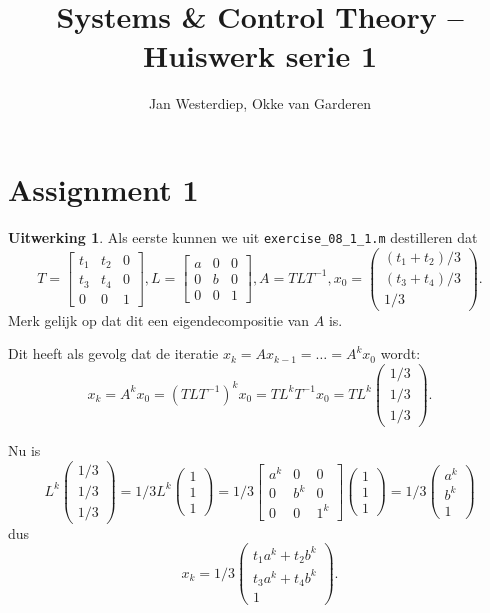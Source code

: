 \documentclass[11pt]{amsart}
\theoremstyle{definition}
\newtheorem*{uitwerking}{Uitwerking}
\begin{document}
\title{Systems \& Control Theory -- Huiswerk serie 1}
\author{Jan Westerdiep, Okke van Garderen}
\maketitle

\section*{Assignment 1}
\begin{uitwerking}
  Als eerste kunnen we uit \texttt{exercise\_08\_1\_1.m} destilleren dat
  \[
  T = \begin{bmatrix} t_1 & t_2 & 0 \\ t_3 & t_4 & 0 \\ 0 & 0 & 1 \end{bmatrix},
  L = \begin{bmatrix} a & 0 & 0 \\ 0 & b & 0 \\ 0 & 0 & 1 \end{bmatrix},
  A = T L T^{-1}, x_0 = \begin{pmatrix} (t_1 + t_2)/3 \\ (t_3 + t_4)/3 \\ 1/3 \end{pmatrix}.
  \]
  Merk gelijk op dat dit een eigendecompositie van $A$ is.

  Dit heeft als gevolg dat de iteratie $x_k = A x_{k-1} = \ldots = A^k x_0$ wordt:
  \[
  x_k = A^k x_0 = (T L T^{-1})^k x_0 = TL^k T^{-1} x_0 = T L^k \begin{pmatrix} 1/3 \\ 1/3 \\ 1/3 \end{pmatrix}.
  \]

  Nu is
  \[
  L^k \begin{pmatrix} 1/3 \\ 1/3 \\ 1/3 \end{pmatrix} = 1/3 L^k \begin{pmatrix} 1 \\ 1 \\ 1 \end{pmatrix} = 1/3 \begin{bmatrix} a^k & 0 & 0 \\ 0 & b^k & 0 \\ 0 & 0 & 1^k \end{bmatrix}\begin{pmatrix} 1 \\ 1 \\ 1 \end{pmatrix} = 1/3 \begin{pmatrix} a^k \\ b^k \\ 1 \end{pmatrix}
  \]
  dus
  \[
  x_k = 1/3 \begin{pmatrix} t_1 a^k + t_2 b^k \\ t_3 a^k + t_4 b^k \\ 1 \end{pmatrix}.
  \]


\end{uitwerking}
\end{document}
